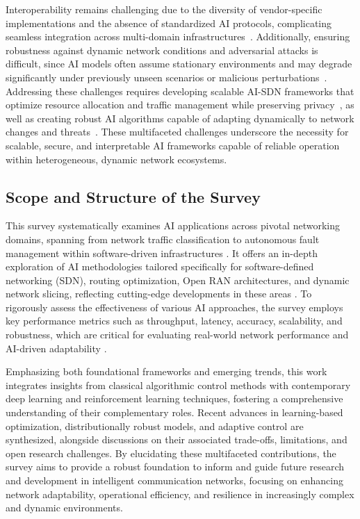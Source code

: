 \documentclass[sigconf]{acmart}
\begin{document}
Interoperability remains challenging due to the diversity of vendor-specific implementations and the absence of standardized AI protocols, complicating seamless integration across multi-domain infrastructures~\cite{ref30,ref48}. Additionally, ensuring robustness against dynamic network conditions and adversarial attacks is difficult, since AI models often assume stationary environments and may degrade significantly under previously unseen scenarios or malicious perturbations~\cite{ref49,ref50,ref53}. Addressing these challenges requires developing scalable AI-SDN frameworks that optimize resource allocation and traffic management while preserving privacy~\cite{ref52}, as well as creating robust AI algorithms capable of adapting dynamically to network changes and threats~\cite{ref49,ref50,ref53}. These multifaceted challenges underscore the necessity for scalable, secure, and interpretable AI frameworks capable of reliable operation within heterogeneous, dynamic network ecosystems.

\subsection{Scope and Structure of the Survey}

This survey systematically examines AI applications across pivotal networking domains, spanning from network traffic classification to autonomous fault management within software-driven infrastructures \cite{ref31,ref32}. It offers an in-depth exploration of AI methodologies tailored specifically for software-defined networking (SDN), routing optimization, Open RAN architectures, and dynamic network slicing, reflecting cutting-edge developments in these areas \cite{ref33,ref34,ref35}. To rigorously assess the effectiveness of various AI approaches, the survey employs key performance metrics such as throughput, latency, accuracy, scalability, and robustness, which are critical for evaluating real-world network performance and AI-driven adaptability \cite{ref51,ref52}.

Emphasizing both foundational frameworks and emerging trends, this work integrates insights from classical algorithmic control methods with contemporary deep learning and reinforcement learning techniques, fostering a comprehensive understanding of their complementary roles. Recent advances in learning-based optimization, distributionally robust models, and adaptive control are synthesized, alongside discussions on their associated trade-offs, limitations, and open research challenges. By elucidating these multifaceted contributions, the survey aims to provide a robust foundation to inform and guide future research and development in intelligent communication networks, focusing on enhancing network adaptability, operational efficiency, and resilience in increasingly complex and dynamic environments.
\end{document}
